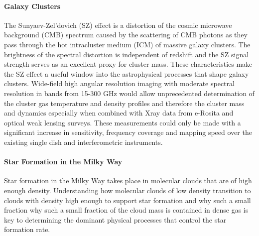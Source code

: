 \paragraph*{Galaxy Clusters}
The Sunyaev-Zel’dovich (SZ) effect is a distortion of the cosmic microwave background (CMB) spectrum caused by the scattering of CMB photons as they pass through the hot intracluster medium (ICM) of massive galaxy clusters. The brightness of the spectral distortion is independent of redshift and the SZ signal strength  serves as an excellent proxy for cluster mass. These characteristics make the SZ effect a useful window into the astrophysical processes that shape galaxy clusters. Wide-field high angular resolution imaging with moderate spectral resolution in bands from 15-300 GHz would allow unprecedented determination of the cluster gas temperature and density profiles and therefore the cluster mass and dynamics especially when combined with Xray data from e-Rosita and optical weak lensing surveys. These measurements could only be made with a significant increase in sensitivity, frequency coverage and mapping speed over the
existing single dish and interferometric instruments.

\paragraph*{Star Formation in the Milky Way}
Star formation in the Milky Way takes place in molecular clouds that are of high enough density. Understanding how molecular clouds of low density transition to clouds with density high enough to support star formation and why such a small fraction why such a small fraction of the cloud mass is contained in dense gas is key to determining the dominant physical processes that control the star formation rate. 

